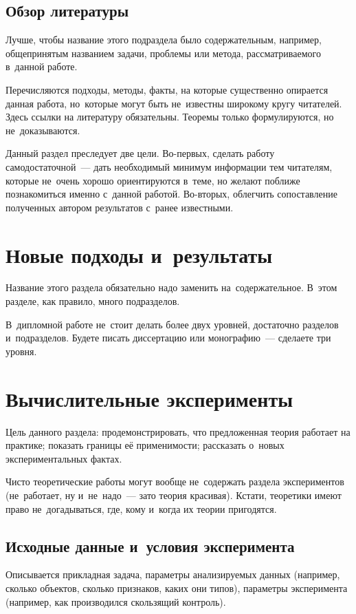 \documentclass[12pt, fleqn]{article}
\begin{document}
\subsection{Обзор литературы}

Лучше, чтобы название этого подраздела было содержательным, 
например, общепринятым названием задачи, проблемы или метода,
рассматриваемого в~данной работе. 

Перечисляются подходы, методы, факты, на которые существенно опирается данная работа, 
но~которые могут быть не~известны широкому кругу читателей.
Здесь ссылки на литературу обязательны. 
Теоремы только формулируются, но не~доказываются.

Данный раздел преследует две цели. 
Во-первых, сделать работу самодостаточной~--- дать необходимый минимум информации тем читателям,
которые не~очень хорошо ориентируются в~теме, но желают поближе познакомиться именно с~данной работой.
Во-вторых, облегчить сопоставление полученных автором результатов с~ранее известными.

\section{Новые подходы и~результаты}

Название этого раздела обязательно надо заменить на~содержательное. 
В~этом разделе, как правило, много подразделов. 

В~дипломной работе не~стоит делать более двух уровней,
достаточно разделов и~подразделов.
Будете писать диссертацию или монографию~--- сделаете три уровня. 
  
\section{Вычислительные эксперименты}

Цель данного раздела:
продемонстрировать, что предложенная теория работает на практике;
показать границы её применимости;
рассказать о~новых экспериментальных фактах.

Чисто теоретические работы могут вообще не~содержать раздела экспериментов
(не~работает, ну и~не~надо~--- зато теория красивая).
Кстати, теоретики имеют право не~догадываться, где, кому и~когда их теории пригодятся.

\subsection{Исходные данные и~условия эксперимента}
Описывается прикладная задача, параметры анализируемых данных 
(например, сколько объектов, сколько признаков, каких они типов), 
параметры эксперимента 
(например, как производился скользящий контроль). 
\end{document}
